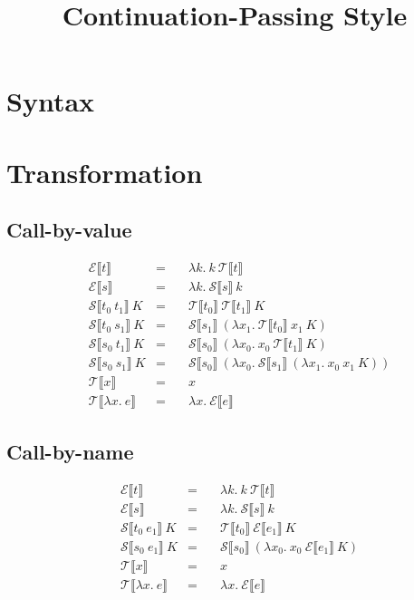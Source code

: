 
\usepackage{graphicx}
\usepackage{mdframed}
\usepackage{stmaryrd}

\newcommand\fun\lambda
\newcommand{\K}[1]{\llbracket #1\rrbracket}
\newcommand{\EK}[1]{\mathcal E\K{#1}}
\newcommand{\SK}[1]{\mathcal S\K{#1}}
\newcommand{\TK}[1]{\mathcal T\K{#1}}
\newcommand{\Edef}[2]{&\EK{#1}&=\quad&#2}
\newcommand{\sdef}[2]{&\SK{#1}~K&=\quad&#2}
\newcommand{\tdef}[2]{&\TK{#1}&=\quad&#2}

\title{Continuation-Passing Style}
\date{}


\maketitle

\section*{Syntax}
\begin{figure}[h]
\begin{mdframed}
\ottmetavars

\ottgrammar
\end{mdframed}
\end{figure}

\section*{Transformation}
\subsection*{Call-by-value}
\begin{align*}
\Edef{t}{\fun k.~k~\TK{t}}\\
\Edef{s}{\fun k.~\SK{s}~k}\\
\sdef{t_0~t_1}{\TK{t_0}~\TK{t_1}~K}\\
\sdef{t_0~s_1}{\SK{s_1}~(\fun x_1.~\TK{t_0}~x_1~K)}\\
\sdef{s_0~t_1}{\SK{s_0}~(\fun x_0.~x_0~\TK{t_1}~K)}\\
\sdef{s_0~s_1}{\SK{s_0}~(\fun x_0.~\SK{s_1}~(\fun x_1.~x_0~x_1~K))}\\
\tdef{x}{x}\\
\tdef{\fun x.~e}{\fun x.~\EK{e}}
\end{align*}

\subsection*{Call-by-name}
\begin{align*}
\Edef{t}{\fun k.~k~\TK{t}}\\
\Edef{s}{\fun k.~\SK{s}~k}\\
\sdef{t_0~e_1}{\TK{t_0}~\EK{e_1}~K}\\
\sdef{s_0~e_1}{\SK{s_0}~(\fun x_0.~x_0~\EK{e_1}~K)}\\
\tdef{x}{x}\\
\tdef{\fun x.~e}{\fun x.~\EK{e}}
\end{align*}

